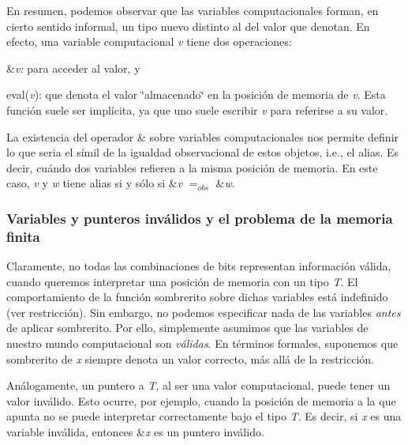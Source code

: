 \-En resumen, podemos observar que las variables computacionales forman, en cierto sentido informal, un tipo nuevo distinto al del valor que denotan. \-En efecto, una variable computacional {\itshape v\/} tiene dos operaciones\-:
\begin{DoxyEnumerate}
\item \&{\itshape v\-:\/} para acceder al valor, y
\item eval({\itshape v\/})\-: que denota el valor \char`\"{}almacenado\char`\"{} en la posición de memoria de {\itshape v\/}. \-Esta función suele ser implícita, ya que uno suele escribir {\itshape v\/} para referirse a su valor.
\end{DoxyEnumerate}

\-La existencia del operador \& sobre variables computacionales nos permite definir lo que seria el símil de la igualdad observacional de estos objetos, i.\-e., el alias. \-Es decir, cuándo dos variables refieren a la misma posición de memoria. \-En este caso, {\itshape v\/} y {\itshape w\/} tiene alias si y sólo si \&{\itshape v\/} $=_{obs}$ \&{\itshape w\/}.\hypertarget{Aliasing_sec-invalido}{}\subsubsection{\-Variables y punteros inválidos y el problema de la memoria finita}\label{Aliasing_sec-invalido}
\-Claramente, no todas las combinaciones de bits representan información válida, cuando queremos interpretar una posición de memoria con un tipo {\itshape \-T\/}. \-El comportamiento de la función sombrerito sobre dichas variables está indefinido (ver restricción). \-Sin embargo, no podemos especificar nada de las variables {\itshape antes\/} de aplicar sombrerito. \-Por ello, simplemente asumimos que las variables de nuestro mundo computacional son {\itshape válidas\/}. \-En términos formales, suponemos que sombrerito de {\itshape x\/} siempre denota un valor correcto, más allá de la restricción.

\-Análogamente, un puntero a {\itshape \-T\/}, al ser una valor computacional, puede tener un valor inválido. \-Esto ocurre, por ejemplo, cuando la posición de memoria a la que apunta no se puede interpretar correctamente bajo el tipo {\itshape \-T\/}. \-Es decir, si {\itshape x\/} es una variable inválida, entonces \&{\itshape x\/} es un puntero inválido.

